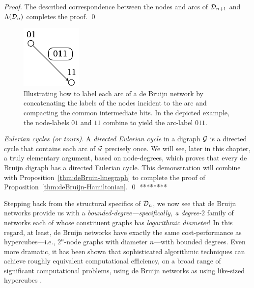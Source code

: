 {\begin{proof}
The described correspondence between the nodes and arcs of $\mbox{$\cal D$}_{n+1}$
and $\Lambda(\mbox{$\cal D$}_n)$ completes the proof.  \qed
\end{proof}

\begin{figure}[hbt]
\begin{center}
       \includegraphics[scale=0.6]{FiguresGraph/dBlabelEdge}
\caption{Illustrating how to label each arc of a de Bruijn network by
  concatenating the labels of the nodes incident to the arc and
  compacting the common intermediate bits.  In the depicted example,
  the node-labels $01$ and $11$ combine to yield the arc-label $011$.}
  \label{fig:dBlabelEdge}
\end{center}
\end{figure}

\medskip

{\it Eulerian cycles (or tours)}. 
 A {\it directed Eulerian cycle} in a digraph
$\mbox{$\cal G$}$ is a directed cycle that contains each arc of $\mbox{$\cal G$}$ precisely
once.  We will see, later in this chapter, a truly elementary
argument, based on node-degrees, which proves that every de Bruijn
digraph has a directed Eulerian cycle.  This demonstration will
combine with Proposition~\ref{thm:deBruin-linegraph} to complete the
proof of Proposition~\ref{thm:deBruijn-Hamiltonian}.  \qed
********}

\bigskip

Stepping back from the structural specifics of $\mbox{$\cal D$}_n$, we now see that
de Bruijn networks provide us with a {\em
  bounded-degree---specifically, a degree-$2$} family of networks each
of whose constituent graphs has {\em logarithmic diameter}!  In this
regard, at least, de Bruijn networks have exactly the same
cost-performance as hypercubes---i.e., $2^n$-node graphs with diameter
$n$---with bounded degrees.  Even more dramatic, it has been shown
that sophisticated algorithmic techniques can achieve roughly
equivalent computational efficiency, on a broad range of significant
computational problems, using de Bruijn networks as using like-sized
hypercubes \cite{AnnexsteinBR90, BermondP89, Ullman84}.
